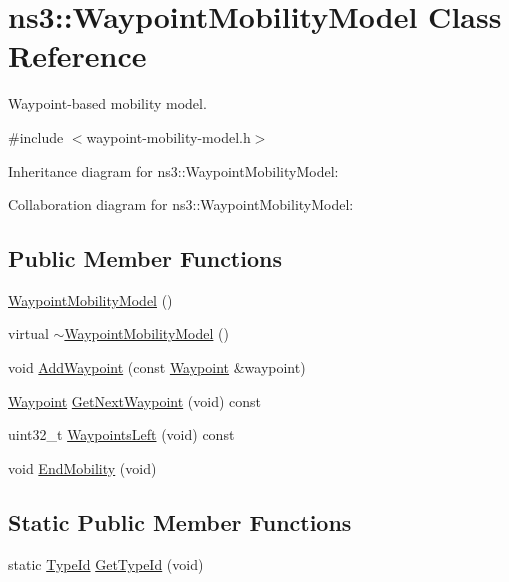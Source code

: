 \hypertarget{classns3_1_1WaypointMobilityModel}{}\section{ns3\+:\+:Waypoint\+Mobility\+Model Class Reference}
\label{classns3_1_1WaypointMobilityModel}


Waypoint-\/based mobility model.  




{\ttfamily \#include $<$waypoint-\/mobility-\/model.\+h$>$}



Inheritance diagram for ns3\+:\+:Waypoint\+Mobility\+Model\+:


Collaboration diagram for ns3\+:\+:Waypoint\+Mobility\+Model\+:
\subsection*{Public Member Functions}
\begin{DoxyCompactItemize}
\item 
\hyperlink{classns3_1_1WaypointMobilityModel_a7963902c3bb7e2ad6ce2729a9f93ca70}{Waypoint\+Mobility\+Model} ()
\item 
virtual \hyperlink{classns3_1_1WaypointMobilityModel_a5240b05b1780bb658d02d55f584db133}{$\sim$\+Waypoint\+Mobility\+Model} ()
\item 
void \hyperlink{classns3_1_1WaypointMobilityModel_ae16c90c21c463289bbea2b3499a94643}{Add\+Waypoint} (const \hyperlink{classns3_1_1Waypoint}{Waypoint} \&waypoint)
\item 
\hyperlink{classns3_1_1Waypoint}{Waypoint} \hyperlink{classns3_1_1WaypointMobilityModel_a44772fb2eca36fdcbdd886881dee85d9}{Get\+Next\+Waypoint} (void) const 
\item 
uint32\+\_\+t \hyperlink{classns3_1_1WaypointMobilityModel_a3ac831dc6e3fe7ad04a61c91db52447a}{Waypoints\+Left} (void) const 
\item 
void \hyperlink{classns3_1_1WaypointMobilityModel_a7b70ccd32a63fb4b1c813da4548050c0}{End\+Mobility} (void)
\end{DoxyCompactItemize}
\subsection*{Static Public Member Functions}
\begin{DoxyCompactItemize}
\item 
static \hyperlink{classns3_1_1TypeId}{Type\+Id} \hyperlink{classns3_1_1WaypointMobilityModel_a6e3e8c2f9282da58f9ecfb3b976db18f}{Get\+Type\+Id} (void)
\end{DoxyCompactItemize}
